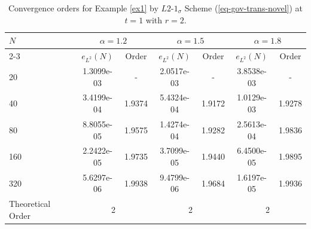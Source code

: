 \documentclass[11pt]{article}
\numberwithin{equation}{section}
\begin{document}
\begin{table}[!ht]
\caption{Convergence orders for Example \ref{ex1} by $L2$-$1_\sigma$ Scheme (\ref{eq-gov-trans-novel}) at $t=1$  with $r=2$.}
\renewcommand{\arraystretch}{1}
\def\temptablewidth{0.95\textwidth}
\begin{center}
 \begin{tabular*}{\temptablewidth}{@{\extracolsep{\fill}}lcccccc}\hline
 $N$  &\multicolumn{2}{c}{$\alpha=1.2$} &\multicolumn{2}{c}{$\alpha=1.5$} &\multicolumn{2}{c}{$\alpha=1.8$}\\
 \cline{2-3}\cline{4-5}\cline{6-7}
 & $e_{L^{2}}(N)$         &Order     &$e_{L^{2}}(N)$    &Order    &$e_{L^{2}}(N)$ &Order     \\ \hline 
 20  &1.3099e-03   &-       &2.0517e-03   &-        &3.8538e-03  &-  \\
 40  &3.4199e-04   &1.9374  &5.4324e-04   &1.9172   &1.0129e-03  &1.9278  \\
 80  &8.8055e-05   &1.9575  &1.4274e-04   &1.9282   &2.5613e-04  &1.9836 \\
 160 &2.2422e-05   &1.9735  &3.7099e-05   &1.9440   &6.4500e-05  &1.9895  \\
 320 &5.6297e-06   &1.9938  &9.4799e-06   &1.9684   &1.6197e-05  &1.9936  \\\hline
 Theoretical Order
 &\multicolumn{2}{c}{2} &\multicolumn{2}{c}{2}&\multicolumn{2}{c}{2}\\ \hline
\end{tabular*}
\end{center}
\end{table}
\fi
\end{document}
